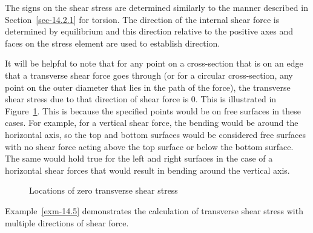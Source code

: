 \documentclass[
  letterpaper,
  DIV=11,
  numbers=noendperiod]{scrreprt}
\theoremstyle{definition}
\theoremstyle{remark}
\begin{document}
The signs on the shear stress are determined similarly to the manner
described in Section~\ref{sec-14.2.1} for torsion. The direction of the
internal shear force is determined by equilibrium and this direction
relative to the positive axes and faces on the stress element are used
to establish direction.

It will be helpful to note that for any point on a cross-section that is
on an edge that a transverse shear force goes through (or for a circular
cross-section, any point on the outer diameter that lies in the path of
the force), the transverse shear stress due to that direction of shear
force is 0. This is illustrated in Figure~\ref{fig-14.9}. This is
because the specified points would be on free surfaces in these cases.
For example, for a vertical shear force, the bending would be around the
horizontal axis, so the top and bottom surfaces would be considered free
surfaces with no shear force acting above the top surface or below the
bottom surface. The same would hold true for the left and right surfaces
in the case of a horizontal shear forces that would result in bending
around the vertical axis.

\begin{figure}


\caption{\label{fig-14.9}Locations of zero transverse shear stress}

\end{figure}%

Example~\ref{exm-14.5} demonstrates the calculation of transverse shear
stress with multiple directions of shear force.
\end{document}
